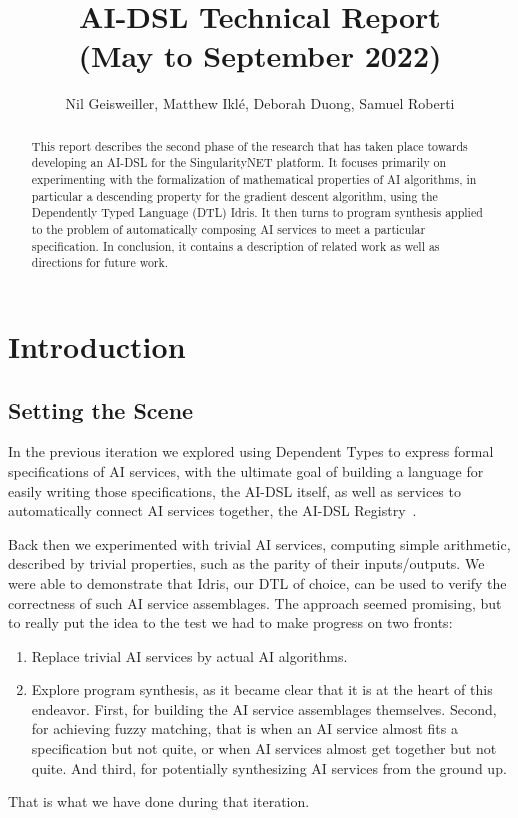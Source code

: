 \documentclass[]{report}
\begin{document}
\title{AI-DSL Technical Report\\(May to September 2022)
}
\author{Nil Geisweiller, Matthew Ikl\'e, Deborah Duong, Samuel Roberti}
\maketitle

\begin{abstract}
  This report describes the second phase of the research that has
  taken place towards developing an AI-DSL for the SingularityNET
  platform.  It focuses primarily on experimenting with the
  formalization of mathematical properties of AI algorithms, in
  particular a descending property for the gradient descent algorithm,
  using the Dependently Typed Language (DTL) Idris.  It then turns to
  program synthesis applied to the problem of automatically composing
  AI services to meet a particular specification.  In conclusion, it
  contains a description of related work as well as directions for
  future work.
\end{abstract}

\tableofcontents

\chapter{Introduction}

\section{Setting the Scene}

In the previous iteration we explored using Dependent Types to express
formal specifications of AI services, with the ultimate goal of
building a language for easily writing those specifications, the
AI-DSL itself, as well as services to automatically connect AI
services together, the AI-DSL Registry~\cite{AIDSLReport2021}.

Back then we experimented with trivial AI services, computing simple
arithmetic, described by trivial properties, such as the parity of
their inputs/outputs.  We were able to demonstrate that Idris, our DTL
of choice, can be used to verify the correctness of such AI service
assemblages.  The approach seemed promising, but to really put the
idea to the test we had to make progress on two fronts:

\begin{enumerate}
\item Replace trivial AI services by actual AI algorithms.
\item Explore program synthesis, as it became clear that it is at the
  heart of this endeavor.  First, for building the AI service
  assemblages themselves.  Second, for achieving fuzzy matching, that
  is when an AI service almost fits a specification but not quite, or
  when AI services almost get together but not quite.  And third, for
  potentially synthesizing AI services from the ground up.
\end{enumerate}
That is what we have done during that iteration.
\end{document}
